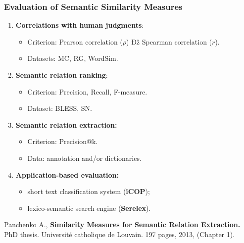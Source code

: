 \begin{frame}
\frametitle{Evaluation of Semantic Similarity Measures}

\begin{enumerate}
\item \textbf{Correlations with human judgments}:
\begin{itemize}
 \item Criterion: Pearson correlation ($\rho$) Ðž Spearman correlation ($r$).
 \item Datasets: MC, RG, WordSim.
\end{itemize}

\item \textbf{Semantic relation ranking}:
\begin{itemize}
 \item Criterion: Precision, Recall, F-measure.
 \item Dataset: BLESS, SN.
\end{itemize}


\item \textbf{Semantic relation extraction:}
\begin{itemize}
 \item Criterion: Precision@k.
 \item Data: annotation and/or dictionaries.
\end{itemize}

\item \textbf{Application-based evaluation:}
\begin{itemize}
\item short text classification system (\textbf{iCOP});
\item lexico-semantic search engine (\textbf{Serelex}).
\end{itemize}
\end{enumerate}


Panchenko A., \textbf{Similarity Measures for Semantic Relation Extraction.} PhD thesis. Universit\'{e} catholique de Louvain. 197 pages, 2013, (Chapter 1). 

\end{frame}







